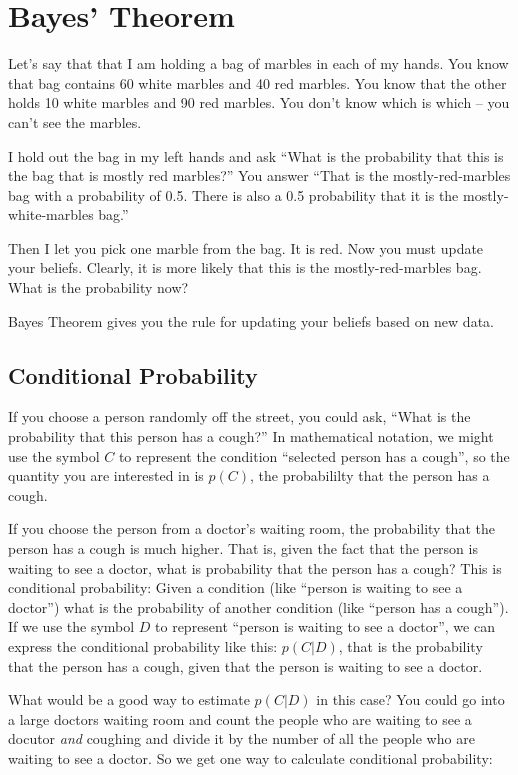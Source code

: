 \chapter{Bayes' Theorem}

Let's say that that I am holding a bag of marbles in each of my hands.
You know that bag contains 60 white marbles and 40 red marbles. You
know that the other holds 10 white marbles and 90 red marbles. You
don't know which is which -- you can't see the marbles.

I hold out the bag in my left hands and ask ``What is the probability
that this is the bag that is mostly red marbles?'' You answer ``That
is the mostly-red-marbles bag with a probability of 0.5.  There is
also a 0.5 probability that it is the mostly-white-marbles bag.''

Then I let you pick one marble from the bag.  It is red. Now you must
update your beliefs. Clearly, it is more likely that this is the
mostly-red-marbles bag. What is the probability now?

Bayes Theorem gives you the rule for updating your beliefs based on
new data.

\section{Conditional Probability}

If you choose a person randomly off the street, you could ask,
``What is the probability that this person has a cough?''  In
mathematical notation, we might use the symbol $C$ to represent the
condition ``selected person has a cough'', so the quantity you are
interested in is $p(C)$, the probabililty that the person has a cough. 

If you choose the person from a doctor's waiting room, the probability
that the person has a cough is much higher. That is, given the fact
that the person is waiting to see a doctor, what is probability that
the person has a cough?  This is conditional probability: Given a
condition (like ``person is waiting to see a doctor'') what is the
probability of another condition (like ``person has a cough''). If we
use the symbol $D$ to represent ``person is waiting to see a doctor'',
we can express the conditional probability like this: $p(C | D)$, that
is the probability that the person has a cough, given that the person
is waiting to see a doctor.

What would be a good way to estimate $p(C | D)$ in this case? You
could go into a large doctors waiting room and count the people who
are waiting to see a docutor \textit{and} coughing and divide it by the number of all the people
who are waiting to see a doctor.  So we get one way to calculate conditional probability:


